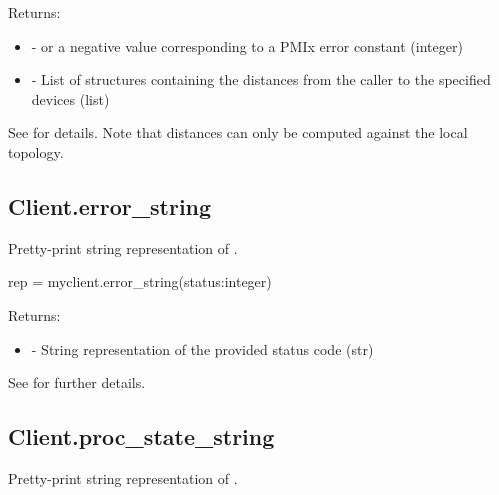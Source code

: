 Returns:

\begin{itemize}
    \item {} -  or a negative value corresponding to a PMIx error constant (integer)
    \item {} - List of  structures containing the distances from the caller to the specified devices (list)
\end{itemize}

See  for details. Note that distances can only be computed against the local topology.



\subsection{Client.error_string}

\summary

Pretty-print string representation of .

\format

\pyspecificstart
\begin{codepar}
rep = myclient.error_string(status:integer)
\end{codepar}
\pyspecificend

\begin{arglist}
\end{arglist}

Returns:
\begin{itemize}
    \item {} - String representation of the provided status code (str)
\end{itemize}

See  for further details.


\subsection{Client.proc_state_string}

\summary

Pretty-print string representation of .

